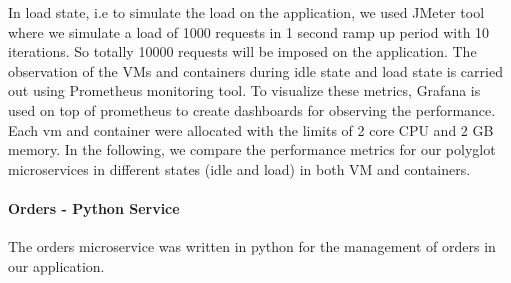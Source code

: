 In load state, i.e to simulate the load on the application, we used JMeter tool where we simulate a load of 1000 requests in 1 second ramp up period with 10 iterations. So totally 10000 requests will be imposed on the application.  The observation of the VMs and containers during idle state and load state is carried out using Prometheus monitoring tool. To visualize these metrics, Grafana is used on top of prometheus to create dashboards for observing the performance. Each vm and container were allocated with the limits of 2 core CPU and 2 GB memory.  In the following, we compare the performance metrics for our polyglot microservices in different states (idle and load) in both VM and containers.


\paragraph { Orders - Python Service}
The orders microservice was written in python for the management of orders in our application. 

